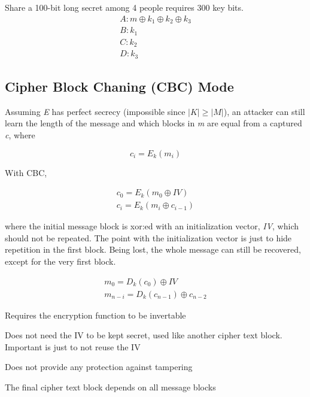 \documentclass[12pt]{article}
\begin{document}
Share a 100-bit long secret among 4 people requires 300 key bits.
\begin{equation}
\begin{split}
A: m \oplus k_1 \oplus k_2 \oplus k_3 \\
B: k_1 \\
C: k_2 \\
D: k_3
\end{split}
\end{equation}
 
\subsection*{Cipher Block Chaning (CBC) Mode}

Assuming \emph{E} has perfect secrecy (impossible since $|K| \ge |M|$), an attacker can still learn the length of the message and which blocks in \emph{m} are equal from a captured \emph{c}, where

\begin{equation}
c_i = E_k(m_i)
\end{equation}

With CBC, 

\begin{equation}
\begin{split}
c_0 = E_k(m_0 \oplus IV) \\
c_i = E_k(m_i \oplus c_{i-1})
\end{split}
\end{equation}

where the initial message block is xor:ed with an initialization vector, \emph{IV}, which should not be repeated. The point with the initialization vector is just to hide repetition in the first block. Being lost, the whole message can still be recovered, except for the very first block.

\begin{equation}
\begin{split}
m_0 = D_k(c_0) \oplus IV \\
m_{n-i} = D_k(c_{n-1}) \oplus c_{n-2}
\end{split}
\end{equation}

\begin{list}{*}{
\setlength{\itemsep}{0pt}
\setlength{\parsep}{0pt}
\setlength{\topsep}{0pt}
\setlength{\partopsep}{0pt}
\setlength{\leftmargin}{2em}
\setlength{\labelwidth}{1.5em}
\setlength{\labelsep}{0.5em}
}
\item Requires the encryption function to be invertable
\item Does not need the IV to be kept secret, used like another cipher text block. Important is just to not reuse the IV
\item Does not provide any protection against tampering
\item The final cipher text block depends on all message blocks
\end{list}
\end{document}

